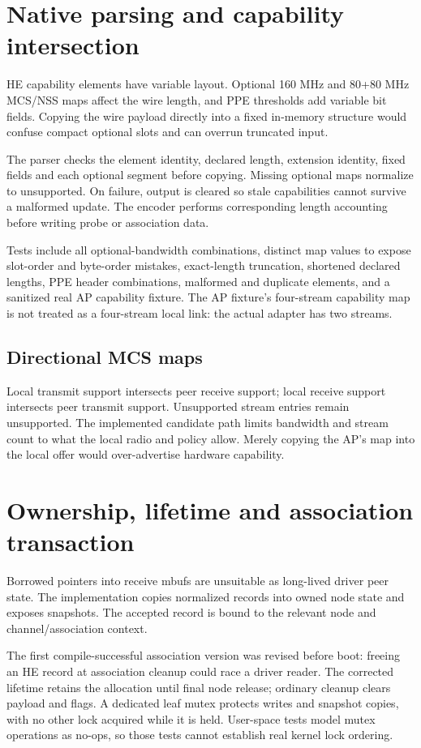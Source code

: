 \documentclass[11pt,letterpaper,oneside]{article}
\begin{document}
\section{Native parsing and capability intersection}
HE capability elements have variable layout. Optional 160 MHz and 80+80 MHz MCS/NSS maps affect the wire length, and PPE thresholds add variable bit fields. Copying the wire payload directly into a fixed in-memory structure would confuse compact optional slots and can overrun truncated input.

The parser checks the element identity, declared length, extension identity, fixed fields and each optional segment before copying. Missing optional maps normalize to unsupported. On failure, output is cleared so stale capabilities cannot survive a malformed update. The encoder performs corresponding length accounting before writing probe or association data.

Tests include all optional-bandwidth combinations, distinct map values to expose slot-order and byte-order mistakes, exact-length truncation, shortened declared lengths, PPE header combinations, malformed and duplicate elements, and a sanitized real AP capability fixture. The AP fixture's four-stream capability map is not treated as a four-stream local link: the actual adapter has two streams.

\subsection{Directional MCS maps}
Local transmit support intersects peer receive support; local receive support intersects peer transmit support. Unsupported stream entries remain unsupported. The implemented candidate path limits bandwidth and stream count to what the local radio and policy allow. Merely copying the AP's map into the local offer would over-advertise hardware capability.

\section{Ownership, lifetime and association transaction}
Borrowed pointers into receive mbufs are unsuitable as long-lived driver peer state. The implementation copies normalized records into owned node state and exposes snapshots. The accepted record is bound to the relevant node and channel/association context.

The first compile-successful association version was revised before boot: freeing an HE record at association cleanup could race a driver reader. The corrected lifetime retains the allocation until final node release; ordinary cleanup clears payload and flags. A dedicated leaf mutex protects writes and snapshot copies, with no other lock acquired while it is held. User-space tests model mutex operations as no-ops, so those tests cannot establish real kernel lock ordering.
\end{document}
